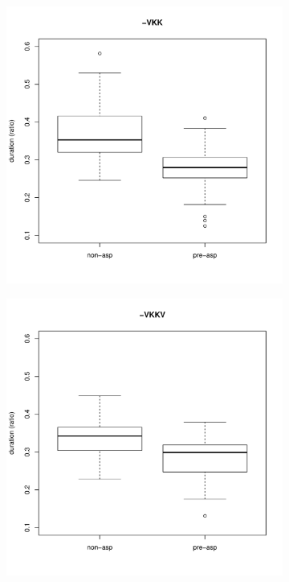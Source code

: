 \documentclass[11pt,a4paper,oneside,openany]{memoir}\usepackage[]{graphicx}\usepackage[]{color}
\newenvironment{knitrout}{}{} %
\begin{document}
\begin{figure}
\begin{subfigure}{.5\textwidth}
\centering
\begin{knitrout}
\color{fgcolor}
\includegraphics[width=\textwidth]{img/mono-stop-box-1} 

\end{knitrout}
\label{f:monostop}
\end{subfigure}
\begin{subfigure}{.5\textwidth}
\centering
\begin{knitrout}
\color{fgcolor}
\includegraphics[width=\textwidth]{img/di-stop-box-1} 


\end{knitrout}
\end{subfigure}
\end{figure}
\end{document}
